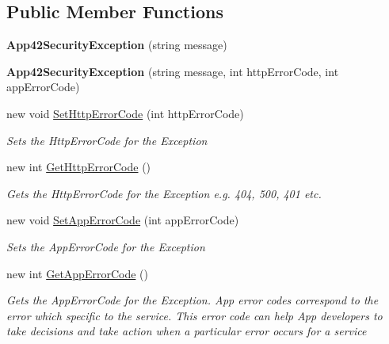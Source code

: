\subsection*{Public Member Functions}
\begin{DoxyCompactItemize}
\item 
\hypertarget{classcom_1_1shephertz_1_1app42_1_1paas_1_1sdk_1_1csharp_1_1_app42_security_exception_aee3dc15d6c820bf29fd52816b4ec7bf2}{{\bfseries App42\+Security\+Exception} (string message)}\label{classcom_1_1shephertz_1_1app42_1_1paas_1_1sdk_1_1csharp_1_1_app42_security_exception_aee3dc15d6c820bf29fd52816b4ec7bf2}

\item 
\hypertarget{classcom_1_1shephertz_1_1app42_1_1paas_1_1sdk_1_1csharp_1_1_app42_security_exception_a73c421ad61ec6b251e64b8203f4e2e4d}{{\bfseries App42\+Security\+Exception} (string message, int http\+Error\+Code, int app\+Error\+Code)}\label{classcom_1_1shephertz_1_1app42_1_1paas_1_1sdk_1_1csharp_1_1_app42_security_exception_a73c421ad61ec6b251e64b8203f4e2e4d}

\item 
new void \hyperlink{classcom_1_1shephertz_1_1app42_1_1paas_1_1sdk_1_1csharp_1_1_app42_security_exception_aa640034a9fdf2f99f442210f5bb7d8ed}{Set\+Http\+Error\+Code} (int http\+Error\+Code)
\begin{DoxyCompactList}\small\item\em Sets the Http\+Error\+Code for the Exception \end{DoxyCompactList}\item 
new int \hyperlink{classcom_1_1shephertz_1_1app42_1_1paas_1_1sdk_1_1csharp_1_1_app42_security_exception_a85ed4d7736cb56dc3c945b3ad674fd3b}{Get\+Http\+Error\+Code} ()
\begin{DoxyCompactList}\small\item\em Gets the Http\+Error\+Code for the Exception e.\+g. 404, 500, 401 etc. \end{DoxyCompactList}\item 
new void \hyperlink{classcom_1_1shephertz_1_1app42_1_1paas_1_1sdk_1_1csharp_1_1_app42_security_exception_a4cb1a5836476a50c6716e627501f7271}{Set\+App\+Error\+Code} (int app\+Error\+Code)
\begin{DoxyCompactList}\small\item\em Sets the App\+Error\+Code for the Exception \end{DoxyCompactList}\item 
new int \hyperlink{classcom_1_1shephertz_1_1app42_1_1paas_1_1sdk_1_1csharp_1_1_app42_security_exception_ada5f00c3d47c51e7d7a8f7ba7b141d93}{Get\+App\+Error\+Code} ()
\begin{DoxyCompactList}\small\item\em Gets the App\+Error\+Code for the Exception. App error codes correspond to the error which specific to the service. This error code can help App developers to take decisions and take action when a particular error occurs for a service \end{DoxyCompactList}\end{DoxyCompactItemize}


